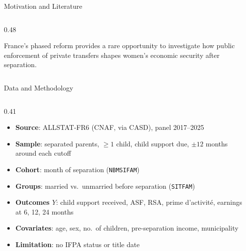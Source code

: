 \documentclass[aspectratio=169,10pt]{beamer}
\newcommand{\blocklabel}[1]{\vspace{0.15cm}{\color{boxframe}\textbf{#1}}\par\vspace{0.05cm}}
\begin{document}
\begin{frame}{Motivation and Literature}
\begin{columns}[T,onlytextwidth]
\begin{column}{0.48\textwidth}
    \begin{keybox}
        \footnotesize
        France's phased reform provides a rare
        opportunity to investigate how public
        enforcement of private transfers shapes
        women's economic security after separation.
    \end{keybox}
\end{column}

\end{columns}
\end{frame}



\begin{frame}{Data and Methodology}
\footnotesize
\begin{columns}[T]
  \begin{column}{0.41\textwidth}
    \blocklabel{Data}
    \begin{itemize}\setlength{\itemsep}{1pt}
      \item \textbf{Source}: ALLSTAT-FR6 (CNAF, via CASD), panel 2017--2025
      \item \textbf{Sample}: separated parents, $\geq 1$ child, child support due, $\pm 12$ months around each cutoff
      \item \textbf{Cohort}: month of separation (\texttt{NBMSIFAM})
      \item \textbf{Groups}: married vs.\ unmarried before separation (\texttt{SITFAM})
      \item \textbf{Outcomes $Y$}: child support received, ASF, RSA, prime d'activit\'e, earnings at 6, 12, 24 months
      \item \textbf{Covariates}: age, sex, no.\ of children, pre-separation income, municipality
      \item \textbf{Limitation}: no IFPA status or title date
    \end{itemize}
  \end{column}


\end{columns}
\end{frame}
\end{document}

